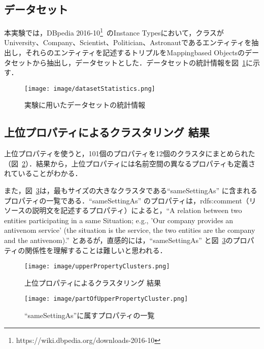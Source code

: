 \subsection{データセット}
\label{sec:datasets}
本実験では，DBpedia 2016-10\footnote{https://wiki.dbpedia.org/downloads-2016-10}\ のInstance Typesにおいて，クラスがUniversity、Company、Scientist、Politician、Astronautであるエンティティを抽出し，それらのエンティティを記述するトリプルをMappingbased Objectsのデータセットから抽出し，データセットとした．データセットの統計情報を図~\ref{fig:datasetStatistics}に示す．
%
\begin{figure}[h]
\centering
\texttt{[image: image/datasetStatistics.png]}
\caption{\small
実験に用いたデータセットの統計情報
}
\label{fig:datasetStatistics}
\end{figure}
%
\subsection{上位プロパティによるクラスタリング 結果}
\label{sec:upperPropertyClusteringResult}
上位プロパティを使うと，101個のプロパティを12個のクラスタにまとめられた（図~\ref{fig:upperPropertyClusters}）．結果から，上位プロパティには名前空間の異なるプロパティも定義されていることがわかる．

また，図~\ref{fig:partOfUpperPropertyCluster}は，最もサイズの大きなクラスタである``sameSettingAs'' に含まれるプロパティの一覧である．``sameSettingAs'' のプロパティは，rdfs:comment（リソースの説明文を記述するプロパティ）によると，``A relation between two entities participating in a same Situation; e.g., 'Our company provides an antivenom service' (the situation is the service, the two entities are the company and the antivenom).'' とあるが，直感的には，``sameSettingAs'' と図~\ref{fig:partOfUpperPropertyCluster}のプロパティの関係性を理解することは難しいと思われる．
%
\begin{figure}[h]
\centering
\texttt{[image: image/upperPropertyClusters.png]}
\caption{\small
上位プロパティによるクラスタリング 結果
}
\label{fig:upperPropertyClusters}
\end{figure}
%
\begin{figure}[h]
\centering
\texttt{[image: image/partOfUpperPropertyCluster.png]}
\caption{\small
``sameSettingAs''に属すプロパティの一覧
}
\label{fig:partOfUpperPropertyCluster}
\end{figure}
%
